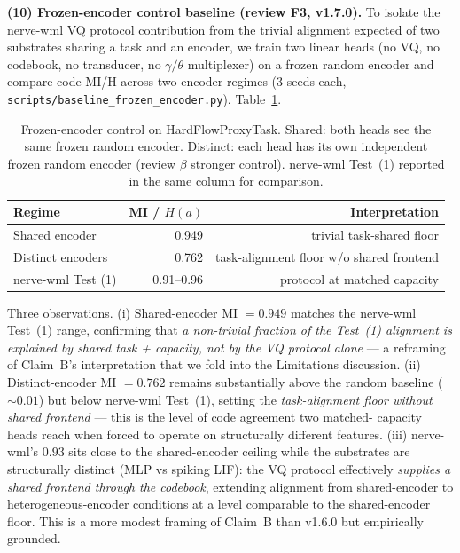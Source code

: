 \documentclass[10pt,twocolumn]{article}
\begin{document}
\textbf{(10) Frozen-encoder control baseline (review F3, v1.7.0).}
To isolate the nerve-wml VQ protocol contribution from the trivial
alignment expected of two substrates sharing a task and an encoder,
we train two linear heads (no VQ, no codebook, no transducer, no
$\gamma/\theta$ multiplexer) on a frozen random encoder and compare
code MI/H across two encoder regimes (3 seeds each,
\texttt{scripts/baseline\_frozen\_encoder.py}). Table~\ref{tab:frozen-baseline}.

\begin{table}[t]
  \centering
  \caption{Frozen-encoder control on HardFlowProxyTask. Shared:
  both heads see the same frozen random encoder. Distinct: each
  head has its own independent frozen random encoder (review
  $\beta$ stronger control). nerve-wml Test~(1) reported in the
  same column for comparison.}
  \label{tab:frozen-baseline}
  \small
  \begin{tabular}{lrr}
    \hline
    Regime & MI / $H(a)$ & Interpretation \\
    \hline
    Shared encoder      & 0.949 & trivial task-shared floor \\
    Distinct encoders   & 0.762 & task-alignment floor w/o shared frontend \\
    nerve-wml Test (1)  & 0.91--0.96 & protocol at matched capacity \\
    \hline
  \end{tabular}
\end{table}

Three observations. (i) Shared-encoder MI $=0.949$ matches the
nerve-wml Test~(1) range, confirming that \emph{a non-trivial
fraction of the Test~(1) alignment is explained by shared task +
capacity, not by the VQ protocol alone} --- a reframing of
Claim~B's interpretation that we fold into the Limitations
discussion. (ii) Distinct-encoder MI $=0.762$ remains substantially
above the random baseline ($\sim 0.01$) but below nerve-wml
Test~(1), setting the \emph{task-alignment floor without shared
frontend} --- this is the level of code agreement two matched-
capacity heads reach when forced to operate on structurally
different features. (iii) nerve-wml's $0.93$ sits close to the
shared-encoder ceiling while the substrates are structurally
distinct (MLP vs spiking LIF): the VQ protocol effectively
\emph{supplies a shared frontend through the codebook}, extending
alignment from shared-encoder to heterogeneous-encoder conditions
at a level comparable to the shared-encoder floor. This is a more
modest framing of Claim~B than v1.6.0 but empirically grounded.
\end{document}
